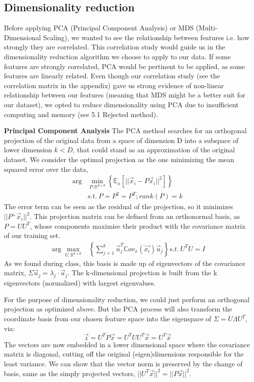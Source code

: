 \documentclass[twocolumn]{article}
\begin{document}
\subsection{Dimensionality reduction}
\label{4.2}
Before applying PCA (Principal Component Analysis) or MDS (Multi-Dimensional Scaling), we wanted to see the relationship between features i.e. how strongly they are correlated. This correlation study would guide us in the dimensionality reduction algorithm we choose to apply to our data. If some features are strongly correlated, PCA would be pertinent to be applied, as some features are linearly related. Even though our correlation study (see the correlation matrix in the appendix) gave us strong evidence of non-linear relationship between our features (meaning that MDS might be a better suit for our dataset), we opted to reduce dimensionality using PCA due to insufficient computing and memory (see 5.1 Rejected method).

\textbf{Principal Component Analysis}
The PCA method searches for an orthogonal projection of the original data from a space of dimension D into a subspace of lower dimension $k < D$, that could stand as an approximation of the original dataset. We consider the optimal projection as the one minimizing the mean squared error over the data,
\begin{align*}
\arg &\min \limits_{P : \mathbb{R}^{d \times d}} \left\{ \mathbb{E}_x \left[ ||\Vec{x}_i - P\Vec{x}_i||^2 \right] \right\} \\
&s.t. \  P = P^2 = P^T; rank(P) = k
\end{align*}
The error term can be seen as the residual of the projection, so it minimizes $||P^{\perp}\Vec{x}_i||^2$. This projection matrix can be defined from an orthonormal basis, as $P = UU^T$, whose components maximise their product with the covariance matrix of our training set.
\begin{align*}
 \arg \max \limits_{U : \mathbb{R}^{k \times d}} &\left\{ \sum^k_{j=1}  \Vec{u}^T_j \mathbb{C}ov_x({\Vec{x_i}}) \Vec{u}_j \right\} s.t. \ U^TU = I
\end{align*}
As we found during class, this basis is made up of eigenvectors of the covariance matrix, $\Sigma\Vec{u}_j = \lambda_j \cdot \Vec{u}_j$. The k-dimensional projection is built from the k eigenvectors (normalized) with largest eigenvalues.

For the purpose of dimensionality reduction, we could just perform an orthogonal projection as optimized above. But the PCA process will also transform the coordinate basis from our chosen feature space into the eigenspace of $\Sigma = U \Lambda U^T$, via:
$$\Vec{z} = U^TP\Vec{x} = U^TUU^T\Vec{x} = U^T\Vec{x}$$
The vectors are now embedded in a lower dimensional space where the covariance matrix is diagonal, cutting off the original (eigen)dimensions responsible for the least variance. We can show that the vector norm is preserved by the change of basis, same as the simply projected vectors, $||U^T\Vec{x}||^2 = ||P\Vec{x}||^2$.
\end{document}
